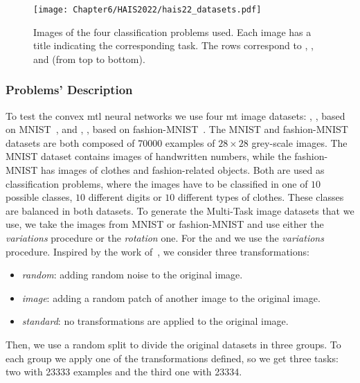 \begin{figure}[t!]
    \texttt{[image: Chapter6/HAIS2022/hais22\_datasets.pdf]}
    \caption{Images of the four classification problems used. Each image has a title indicating the corresponding task. The rows correspond to , ,  and  (from top to bottom).}
    \label{fig:problems_hais2022}
\end{figure}

\subsubsection*{Problems' Description}
To test the convex \acrshort{mtl} neural networks we use four \acrshort{mt} image datasets:
, , based on MNIST~\citep{LeCunBBH98}, and , , based on fashion-MNIST~\citep{xiao2017}.
%
The MNIST and fashion-MNIST datasets are both composed of \num{70000} examples of $28\times 28$ grey-scale images. The MNIST dataset contains images of handwritten numbers, while the fashion-MNIST has images of clothes and fashion-related objects.
Both are used as classification problems, where the images have to be classified in one of $10$ possible classes, $10$ different digits or $10$ different types of clothes. These classes are balanced in both datasets.
%
To generate the Multi-Task image datasets that we use, we take the images from MNIST or fashion-MNIST and use either the \emph{variations} procedure or the \emph{rotation} one.
%
For the  and  we use the \emph{variations} procedure. Inspired by the work of~\cite{BergstraB12}, we consider three transformations:
\begin{itemize}
    \item \textit{random}: adding random noise to the original image.
    \item \textit{image}: adding a random patch of another image to the original image.
    \item \textit{standard}: no transformations are applied to the original image.
\end{itemize}
Then, we use a random split to divide the original datasets in three groups. To each group we apply one of the transformations defined, so we get three tasks: two with \num{23333} examples and the third one with \num{23334}.

